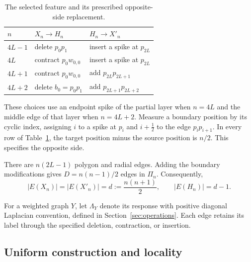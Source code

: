 \documentclass[11pt]{article}
\theoremstyle{definition}
\begin{document}
\begin{table}[htbp]
\centering
\begin{tabular}{@{}lll@{}}
\toprule
\(n\) & \(X_n\longrightarrow H_n\) & \(H_n\longrightarrow X'_n\)\\
\midrule
\(4L-1\) & delete \(p_0p_1\) & insert a spike at \(p_{2L}\)\\
\(4L\) & contract \(p_0w_{0,0}\) & insert a spike at \(p_{2L}\)\\
\(4L+1\) & contract \(p_0w_{0,0}\) & add \(p_{2L}p_{2L+1}\)\\
\(4L+2\) & delete \(b_0=p_0p_1\) & add \(p_{2L+1}p_{2L+2}\)\\
\bottomrule
\end{tabular}
\caption{The selected feature and its prescribed opposite-side replacement.}
\label{tab:features}
\end{table}

These choices use an endpoint spike of the partial layer when \(n=4L\)
and the middle edge of that layer when \(n=4L+2\).
Measure a boundary position by its cyclic index, assigning \(i\)
to a spike at \(p_i\) and \(i+\tfrac12\) to the edge \(p_ip_{i+1}\).
In every row of Table~\ref{tab:features}, the target position minus
the source position is \(n/2\). This specifies the opposite side.

There are \(n(2L-1)\) polygon and radial edges. Adding the boundary
modifications gives \(D=n(n-1)/2\) edges in \(\Pi_n\). Consequently,
\begin{equation}
 |E(X_n)|=|E(X'_n)|=d:=\frac{n(n+1)}2,\qquad |E(H_n)|=d-1 .
 \label{eq:edge-counts}
\end{equation}

For a weighted graph \(Y\), let \(\Lambda_Y\) denote its response with
positive diagonal Laplacian convention, defined in
Section~\ref{sec:operations}. Each edge retains its label through the
specified deletion, contraction, or insertion.

\subsection{Uniform construction and locality}
\end{document}
